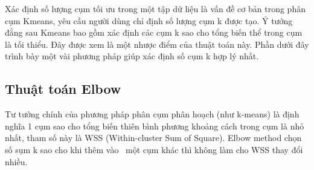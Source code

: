 Xác định số lượng cụm tối ưu trong một tập dữ liệu là vấn đề cơ bản trong phân cụm Kmeans, yêu cầu người dùng chỉ định số lượng cụm k được tạo. Ý tưởng đằng sau Kmeans bao gồm xác định các cụm k sao cho tổng biến thể trong cụm là tối thiểu. Đây được xem là một nhược điểm của thuật toán này. Phần dưới đây trình bày một vài phương pháp giúp xác định số cụm k hợp lý nhất.\par
\subsection{Thuật toán Elbow}
Tư tưởng chính của phương pháp phân cụm phân hoạch (như k-means) là định nghĩa 1 cụm sao cho tổng biến thiên bình phương khoảng cách trong cụm là nhỏ nhất, tham số này là WSS (Within-cluster Sum of Square). Elbow method chọn số sụm k sao cho khi thêm vào  một cụm khác thì không làm cho WSS thay đổi nhiều.